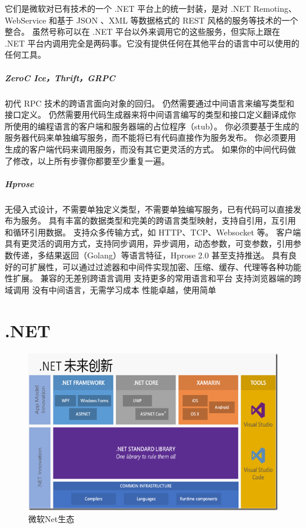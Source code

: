 \documentclass{book}
\begin{document}
它们是微软对已有技术的一个 .NET 平台上的统一封装，是对 .NET Remoting、WebService 和基于 JSON 、XML 等数据格式的 REST 风格的服务等技术的一个整合。
虽然号称可以在 .NET 平台以外来调用它的这些服务，但实际上跟在 .NET 平台内调用完全是两码事。它没有提供任何在其他平台的语言中可以使用的任何工具。

\paragraph{ZeroC Ice，Thrift，GRPC}

初代 RPC 技术的跨语言面向对象的回归。
仍然需要通过中间语言来编写类型和接口定义。
仍然需要用代码生成器来将中间语言编写的类型和接口定义翻译成你所使用的编程语言的客户端和服务器端的占位程序（stub）。
你必须要基于生成的服务器代码来单独编写服务，而不能将已有代码直接作为服务发布。
你必须要用生成的客户端代码来调用服务，而没有其它更灵活的方式。
如果你的中间代码做了修改，以上所有步骤你都要至少重复一遍。

\paragraph{Hprose}

无侵入式设计，不需要单独定义类型，不需要单独编写服务，已有代码可以直接发布为服务。
具有丰富的数据类型和完美的跨语言类型映射，支持自引用，互引用和循环引用数据。
支持众多传输方式，如 HTTP、TCP、Websocket 等。
客户端具有更灵活的调用方式，支持同步调用，异步调用，动态参数，可变参数，引用参数传递，多结果返回（Golang）等语言特征，Hprose 2.0 甚至支持推送。
具有良好的可扩展性，可以通过过滤器和中间件实现加密、压缩、缓存、代理等各种功能性扩展。
兼容的无差别跨语言调用
支持更多的常用语言和平台
支持浏览器端的跨域调用
没有中间语言，无需学习成本
性能卓越，使用简单

\chapter{.NET}

\clearpage
\mbox{}         
\clearpage

\begin{figure}[htbp]
	\centering
	\includegraphics[scale=0.8]{NetInfrastracture.png}
	\caption{微软Net生态}
	\label{fig:NetInfrastracture}
\end{figure}
\end{document}
